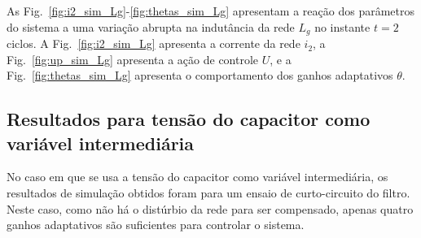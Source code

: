   As Fig.~\ref{fig:i2_sim_Lg}-\ref{fig:thetas_sim_Lg} apresentam a reação dos parâmetros do sistema a uma variação abrupta na indutância da rede $L_g$ no instante $t=2$ ciclos. A Fig.~\ref{fig:i2_sim_Lg} apresenta a corrente da rede $i_2$, a Fig.~\ref{fig:up_sim_Lg} apresenta a ação de controle $U$, e a Fig.~\ref{fig:thetas_sim_Lg} apresenta o comportamento dos ganhos adaptativos $\theta$.

  \vfill
  \noindent
  \begin{minipage}{\textwidth}
    \makebox[\textwidth]{
      \centering
      \def\svgwidth{\textwidth}
      }
    \label{fig:i2_sim_Lg}
  \end{minipage}
  \vfill

  \newpage

  \vfill
  \noindent
  \begin{minipage}{0.9\textwidth}
    \makebox[\textwidth]{
      \centering
      \def\svgwidth{\textwidth}
      }
    \label{fig:up_sim_Lg}
  \end{minipage}

  \vfill
  \noindent
  \begin{minipage}{0.9\textwidth}
    \makebox[\textwidth]{
      \centering
      \def\svgwidth{\textwidth}
      }
    \label{fig:thetas_sim_Lg}
  \end{minipage}

  \vfill

  \newpage

  \subsection{Resultados para tensão do capacitor como variável intermediária}

  No caso em que se usa a tensão do capacitor como variável intermediária, os resultados de simulação obtidos foram para um ensaio de curto-circuito do filtro. Neste caso, como não há o distúrbio da rede para ser compensado, apenas quatro ganhos adaptativos são suficientes para controlar o sistema.

